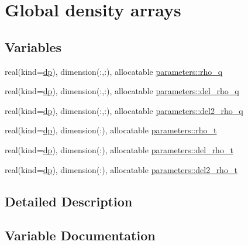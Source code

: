 \hypertarget{group__DENSITIES}{}\section{Global density arrays}
\label{group__DENSITIES}
\subsection*{Variables}
\begin{DoxyCompactItemize}
\item 
real(kind=\mbox{\hyperlink{namespaceparameters_a52f8c6351fd79345d8811e065bcbbb37}{dp}}), dimension(\+:,\+:), allocatable \mbox{\hyperlink{group__DENSITIES_ga75b48fc89c0f01176fd8c58ced2979a8}{parameters\+::rho\+\_\+q}}
\item 
real(kind=\mbox{\hyperlink{namespaceparameters_a52f8c6351fd79345d8811e065bcbbb37}{dp}}), dimension(\+:,\+:), allocatable \mbox{\hyperlink{group__DENSITIES_ga8a7e7d5715287b287f2153291460783b}{parameters\+::del\+\_\+rho\+\_\+q}}
\item 
real(kind=\mbox{\hyperlink{namespaceparameters_a52f8c6351fd79345d8811e065bcbbb37}{dp}}), dimension(\+:,\+:), allocatable \mbox{\hyperlink{group__DENSITIES_ga9ccabc81160e04e43330cf8f61472f0e}{parameters\+::del2\+\_\+rho\+\_\+q}}
\item 
real(kind=\mbox{\hyperlink{namespaceparameters_a52f8c6351fd79345d8811e065bcbbb37}{dp}}), dimension(\+:), allocatable \mbox{\hyperlink{group__DENSITIES_gacd0134e8939522696ec62e629c100fd9}{parameters\+::rho\+\_\+t}}
\item 
real(kind=\mbox{\hyperlink{namespaceparameters_a52f8c6351fd79345d8811e065bcbbb37}{dp}}), dimension(\+:), allocatable \mbox{\hyperlink{group__DENSITIES_ga4d25fcfcb307d476b79d22bc2abe545b}{parameters\+::del\+\_\+rho\+\_\+t}}
\item 
real(kind=\mbox{\hyperlink{namespaceparameters_a52f8c6351fd79345d8811e065bcbbb37}{dp}}), dimension(\+:), allocatable \mbox{\hyperlink{group__DENSITIES_ga419642d914eb5865bb3537f5a4df7d34}{parameters\+::del2\+\_\+rho\+\_\+t}}
\end{DoxyCompactItemize}


\subsection{Detailed Description}


\subsection{Variable Documentation}
\mbox{\label{group__DENSITIES_ga9ccabc81160e04e43330cf8f61472f0e}} 
